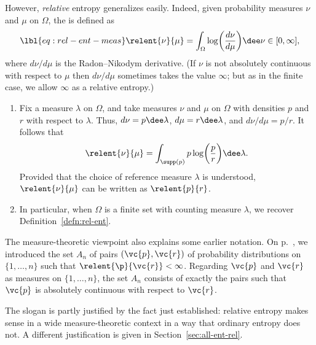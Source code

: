 However, \emph{relative} entropy generalizes easily.  Indeed, given
probability measures $\nu$ and $\mu$ on $\Omega$, the
 is defined as
% 
\begin{equation}
\lbl{eq:rel-ent-meas}
\relent{\nu}{\mu}
=
\int_\Omega \log \biggl( \frac{d\nu}{d\mu} \biggr) \dee\nu
\in
[0, \infty],
\end{equation}
% 
where $d\nu/d\mu$ is
the Radon--Nikodym derivative.  (If $\nu$ is not absolutely
continuous with respect to $\mu$ then $d\nu/d\mu$ sometimes takes the value
$\infty$; but as in the finite case, we allow $\infty$ as a relative
entropy.)  

\begin{examples}
\begin{enumerate}
\item
{}
Fix a measure $\lambda$ on $\Omega$, and take measures $\nu$ and $\mu$ on
$\Omega$ with densities $p$ and $r$ with respect to $\lambda$.  Thus, $d\nu
= p \dee\lambda$, $d\mu = r\dee\lambda$, and $d\nu/d\mu = p/r$.  It follows
that
% 
\begin{equation*}
\relent{\nu}{\mu}
=
\int_{\supp(p)} p \log \biggl(\frac{p}{r}\biggr) \dee\lambda.
\end{equation*}
% 
Provided that the choice of reference measure $\lambda$ is understood,
$\relent{\nu}{\mu}$ can be written as $\relent{p}{r}$.

\item
In particular, when $\Omega$ is a finite set with counting measure
$\lambda$, we recover Definition~\ref{defn:rel-ent}.
\end{enumerate}
\end{examples}

The measure-theoretic viewpoint also explains some earlier notation.  On
p.~\pageref{p:An}, we introduced the set $A_n$ of pairs $(\vc{p}, \vc{r})$
of probability distributions on $\{1, \ldots, n\}$ such that
$\relent{\p}{\vc{r}} < \infty$.  Regarding $\vc{p}$ and $\vc{r}$ as
measures on $\{1, \ldots, n\}$, the set $A_n$ consists of exactly the pairs
such that $\vc{p}$ is absolutely continuous with respect to $\vc{r}$.

The slogan
% 
%
% 
is partly justified by the fact just established: relative entropy makes
sense in a wide measure-theoretic context in a way that ordinary entropy
does not.  A different justification is given in
Section~\ref{sec:all-ent-rel}.

